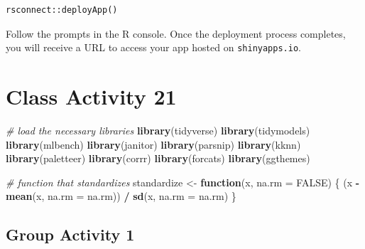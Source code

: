 \documentclass[
]{book}
\newenvironment{Shaded}{\begin{snugshade}}{\end{snugshade}}
\newcommand{\AttributeTok}[1]{\textcolor[rgb]{0.13,0.29,0.53}{#1}}
\newcommand{\CommentTok}[1]{\textcolor[rgb]{0.56,0.35,0.01}{\textit{#1}}}
\newcommand{\ConstantTok}[1]{\textcolor[rgb]{0.56,0.35,0.01}{#1}}
\newcommand{\ControlFlowTok}[1]{\textcolor[rgb]{0.13,0.29,0.53}{\textbf{#1}}}
\newcommand{\FunctionTok}[1]{\textcolor[rgb]{0.13,0.29,0.53}{\textbf{#1}}}
\newcommand{\NormalTok}[1]{#1}
\newcommand{\OtherTok}[1]{\textcolor[rgb]{0.56,0.35,0.01}{#1}}
\newcommand{\SpecialCharTok}[1]{\textcolor[rgb]{0.81,0.36,0.00}{\textbf{#1}}}
\begin{document}
\begin{verbatim}
rsconnect::deployApp()
\end{verbatim}

Follow the prompts in the R console. Once the deployment process completes, you will receive a URL to access your app hosted on \texttt{shinyapps.io}.

\hypertarget{class-activity-21}{%
\chapter{Class Activity 21}\label{class-activity-21}}

\begin{Shaded}
\begin{Highlighting}[]
\CommentTok{\# load the necessary libraries}
\FunctionTok{library}\NormalTok{(tidyverse) }
\FunctionTok{library}\NormalTok{(tidymodels)}
\FunctionTok{library}\NormalTok{(mlbench)     }
\FunctionTok{library}\NormalTok{(janitor)}
\FunctionTok{library}\NormalTok{(parsnip)}
\FunctionTok{library}\NormalTok{(kknn)}
\FunctionTok{library}\NormalTok{(paletteer)}
\FunctionTok{library}\NormalTok{(corrr)}
\FunctionTok{library}\NormalTok{(forcats)}
\FunctionTok{library}\NormalTok{(ggthemes)}

\CommentTok{\# function that standardizes}
\NormalTok{standardize }\OtherTok{\textless{}{-}} \ControlFlowTok{function}\NormalTok{(x, }\AttributeTok{na.rm =} \ConstantTok{FALSE}\NormalTok{) \{}
\NormalTok{  (x }\SpecialCharTok{{-}} \FunctionTok{mean}\NormalTok{(x, }\AttributeTok{na.rm =}\NormalTok{ na.rm)) }\SpecialCharTok{/} 
    \FunctionTok{sd}\NormalTok{(x, }\AttributeTok{na.rm =}\NormalTok{ na.rm)}
\NormalTok{\}}
\end{Highlighting}
\end{Shaded}

\hypertarget{group-activity-1-6}{%
\section{Group Activity 1}\label{group-activity-1-6}}
\end{document}
